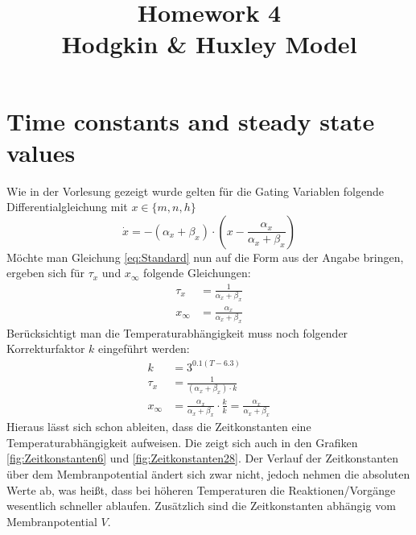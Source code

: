 \documentclass[conference]{IEEEtran}
\begin{document}
%
%
\title{Homework 4\\ Hodgkin \& Huxley Model}

\author{
}


\maketitle

\IEEEpeerreviewmaketitle

\section{Time constants and steady state values}
Wie in der Vorlesung gezeigt wurde gelten für die Gating Variablen folgende Differentialgleichung mit $x \in \{m,n,h\}$
\begin{equation}
	\dot{x} = -(\alpha_x + \beta_x) \cdot \left(x - \frac{\alpha_x}{\alpha_x + \beta_x}\right)
	\label{eq:Standard}
\end{equation}
Möchte man Gleichung \eqref{eq:Standard} nun auf die Form aus der Angabe bringen, ergeben sich für $\tau_x$ und $x_{\infty}$ folgende Gleichungen:
\begin{align}
	\tau_x & = \frac{1}{\alpha_x + \beta_x}\\
	x_{\infty} & = \frac{\alpha_x}{\alpha_x + \beta_x}
\end{align}
Berücksichtigt man die Temperaturabhängigkeit muss noch folgender Korrekturfaktor $k$ eingeführt werden:
\begin{align}
	k & = 3^{0.1 (T-6.3)}\\
	\tau_x & = \frac{1}{(\alpha_x + \beta_x) \cdot k}\\
	x_{\infty} & = \frac{\alpha_x}{\alpha_x + \beta_x} \cdot \frac{k}{k} = \frac{\alpha_x}{\alpha_x + \beta_x}
\end{align}
Hieraus lässt sich schon ableiten, dass die Zeitkonstanten eine Temperaturabhängigkeit aufweisen. Die zeigt sich auch in den Grafiken \ref{fig:Zeitkonstanten6} und \ref{fig:Zeitkonstanten28}. Der Verlauf der Zeitkonstanten über dem Membranpotential ändert sich zwar nicht, jedoch nehmen die absoluten Werte ab, was heißt, dass bei höheren Temperaturen die Reaktionen/Vorgänge wesentlich schneller ablaufen. Zusätzlich sind die Zeitkonstanten abhängig vom Membranpotential $V$.
\end{document}
